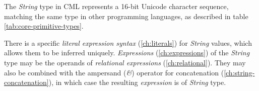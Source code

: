 The \emph{String} type in CML represents a 16-bit Unicode character sequence,
matching the same type in other programming languages,
as described in table \ref{tab:core-primitive-types}.

There is a specific \emph{literal expression syntax} (\ref{ch:literals})
for \emph{String} values,
which allows them to be inferred uniquely.
\emph{Expressions} (\ref{ch:expressions}) of the \emph{String} type
may be the operands of \emph{relational expressions} (\ref{ch:relational}).
They may also be combined with the ampersand (\emph{\&}) operator
for concatenation (\ref{ch:string-concatenation}),
in which case the resulting \emph{expression} is of \emph{String} type.
